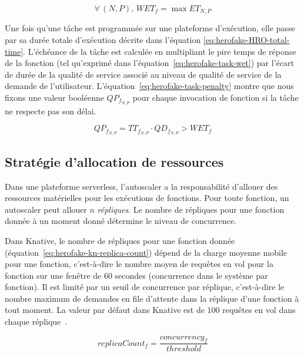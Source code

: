 \begin{equation}
    \forall \, (N, P), \, WET_{f} = \max ET_{N, P}
\label{eq:herofake-task-wet}
\end{equation}

Une fois qu'une tâche est programmée sur une plateforme d'exécution, elle passe par sa durée totale d'exécution décrite dans l'équation \ref{eq:herofake-HRO-total-time}. L'échéance de la tâche est calculée en multipliant le pire temps de réponse de la fonction (tel qu'exprimé dans l'équation~\ref{eq:herofake-task-wet}) par l'écart de durée de la qualité de service associé au niveau de qualité de service de la demande de l'utilisateur. L'équation~\ref{eq:herofake-task-penalty} montre que nous fixons une valeur booléenne $QP_{f_{N, P}}$ pour chaque invocation de fonction si la tâche ne respecte pas son délai. 


\begin{equation}
    QP_{f_{N, P}} = TT_{f_{N, P}} \cdot QD_{f_{N, P}} > WET_{f}
\label{eq:herofake-task-penalty}
\end{equation}

\subsection{Stratégie d'allocation de ressources} \label{section:herofake-autoscaling-strategy}

Dans une plateforme serverless, l'autoscaler a la responsabilité d'allouer des ressources matérielles pour les exécutions de fonctions. Pour toute fonction, un autoscaler peut allouer $n$ \textit{répliques}. Le nombre de répliques pour une fonction donnée à un moment donné détermine le niveau de concurrence.

Dans Knative, le nombre de répliques pour une fonction donnée (équation~\ref{eq:herofake-kn-replica-count}) dépend de la charge moyenne mobile pour une fonction, c'est-à-dire le nombre moyen de requêtes en vol pour la fonction sur une fenêtre de 60 secondes (concurrence dans le système par fonction). Il est limité par un seuil de concurrence par réplique, c'est-à-dire le nombre maximum de demandes en file d'attente dans la réplique d'une fonction à tout moment. La valeur par défaut dans Knative est de 100 requêtes en vol dans chaque réplique~\cite{knative-autoscaling}.

\begin{equation}
    replicaCount_{f} = \frac{concurrency_{f}}{threshold}
\label{eq:herofake-kn-replica-count}
\end{equation}

